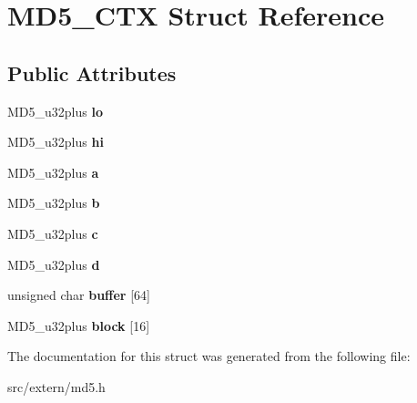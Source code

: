 \hypertarget{structMD5__CTX}{\section{M\-D5\-\_\-\-C\-T\-X Struct Reference}
\label{structMD5__CTX}
}
\subsection*{Public Attributes}
\begin{DoxyCompactItemize}
\item 
\hypertarget{structMD5__CTX_a90437ec62a8dda787f1667061d9755fe}{M\-D5\-\_\-u32plus {\bfseries lo}}\label{structMD5__CTX_a90437ec62a8dda787f1667061d9755fe}

\item 
\hypertarget{structMD5__CTX_a3234f683810977ac629c2a8a05a1cc87}{M\-D5\-\_\-u32plus {\bfseries hi}}\label{structMD5__CTX_a3234f683810977ac629c2a8a05a1cc87}

\item 
\hypertarget{structMD5__CTX_abfbd731eb0b9d13a75ee4e49715e30b5}{M\-D5\-\_\-u32plus {\bfseries a}}\label{structMD5__CTX_abfbd731eb0b9d13a75ee4e49715e30b5}

\item 
\hypertarget{structMD5__CTX_a63ef5819a909e0b4065796dfdac25962}{M\-D5\-\_\-u32plus {\bfseries b}}\label{structMD5__CTX_a63ef5819a909e0b4065796dfdac25962}

\item 
\hypertarget{structMD5__CTX_a6226440d9b52200d32153df206fe3761}{M\-D5\-\_\-u32plus {\bfseries c}}\label{structMD5__CTX_a6226440d9b52200d32153df206fe3761}

\item 
\hypertarget{structMD5__CTX_a3b2316dbfcad4bdb1306dc441761f396}{M\-D5\-\_\-u32plus {\bfseries d}}\label{structMD5__CTX_a3b2316dbfcad4bdb1306dc441761f396}

\item 
\hypertarget{structMD5__CTX_a2da73ecf544745f58211e998719f367f}{unsigned char {\bfseries buffer} \mbox{[}64\mbox{]}}\label{structMD5__CTX_a2da73ecf544745f58211e998719f367f}

\item 
\hypertarget{structMD5__CTX_a2db62677a153981a205d225b051f0609}{M\-D5\-\_\-u32plus {\bfseries block} \mbox{[}16\mbox{]}}\label{structMD5__CTX_a2db62677a153981a205d225b051f0609}

\end{DoxyCompactItemize}


The documentation for this struct was generated from the following file\-:\begin{DoxyCompactItemize}
\item 
src/extern/md5.\-h\end{DoxyCompactItemize}
